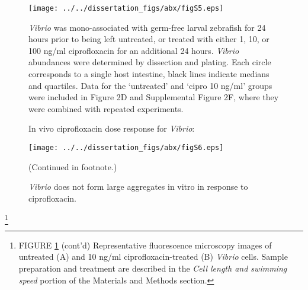 {{%

\begin{figure}[H]
	\centerline{
		\texttt{[image: ../../dissertation\_figs/abx/figS5.eps]}}
	\caption{In vivo ciprofloxacin dose response for \textit{Vibrio}:}{\textit{Vibrio} was mono-associated with germ-free larval zebrafish for 24 hours prior to being left untreated, or treated with either 1, 10, or 100 ng/ml ciprofloxacin for an additional 24 hours.  \textit{Vibrio} abundances were determined by dissection and plating. Each circle corresponds to a single host intestine, black lines indicate medians and quartiles. Data for the `untreated' and `cipro 10 ng/ml' groups were included in Figure 2D and Supplemental Figure 2F, where they were combined with repeated experiments.}
\end{figure}



\begin{figure}[H]
	\centerline{
		\texttt{[image: ../../dissertation\_figs/abx/figS6.eps]}} 
	\caption{\textit{Vibrio} does not form large aggregates in vitro in response to ciprofloxacin.}{(Continued in footnote.)}
	\label{fig:figS6}
\end{figure}

{\let\thefootnote\relax\footnote{FIGURE \ref{fig:figS6} (cont'd) Representative fluorescence microscopy images of untreated (A) and 10 ng/ml ciprofloxacin-treated (B) \textit{Vibrio} cells. Sample preparation and treatment are described in the \textit{Cell length and swimming speed} portion of the Materials and Methods section.}
		

}}}
